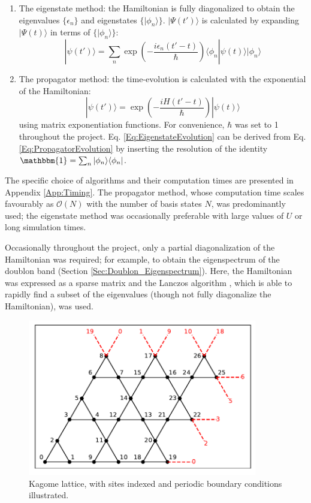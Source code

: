 \begin{enumerate}
    \item The eigenstate method: the Hamiltonian is fully diagonalized to obtain the eigenvalues $\{\epsilon_n\}$ and eigenstates $\{|\phi_n\rangle\}$. $|\Psi(t')\rangle$ is calculated by expanding $|\Psi(t)\rangle$ in terms of $\{|\phi_n\rangle\}$:
    \begin{equation}\label{Eq:EigenstateEvolution}
        |\psi(t')\rangle = \sum_n \exp{\left(-\frac{i\epsilon_{n}(t'-t)}{\hbar}\right)}\langle \phi_n|\psi(t)\rangle|\phi_n\rangle
    \end{equation}
    \item The propagator method: the time-evolution is calculated with the exponential of the Hamiltonian:
    \begin{equation}\label{Eq:PropagatorEvolution}
        |\psi(t')\rangle = \exp{\left(-\frac{iH(t'-t)}{\hbar}\right)}|\psi(t)\rangle
    \end{equation}
    using matrix exponentiation functions. For convenience, $\hbar$ was set to 1 throughout the project. Eq. \ref{Eq:EigenstateEvolution} can be derived from Eq. \ref{Eq:PropagatorEvolution} by inserting the resolution of the identity $\mathbbm{1}=\sum_n|\phi_n\rangle\langle\phi_n|$. 
\end{enumerate}

The specific choice of algorithms and their computation times are presented in Appendix \ref{App:Timing}. The propagator method, whose computation time scales favourably as $\mathcal{O}(N)$ with the number of basis states $N$, was predominantly used; the eigenstate method was occasionally preferable with large values of $U$ or long simulation times. 

Occasionally throughout the project, only a partial diagonalization of the Hamiltonian was required; for example, to obtain the eigenspectrum of the doublon band (Section \ref{Sec:Doublon_Eigenspectrum}). Here, the Hamiltonian was expressed as a sparse matrix and the Lanczos algorithm \cite{Weisse}, which is able to rapidly find a subset of the eigenvalues (though not fully diagonalize the Hamiltonian), was used.

\vspace{0.5cm}

\begin{figure}[ht]
    \centering
    \includegraphics[width=10cm]{Figures/Lattice_Enumerated}
    \caption{Kagome lattice, with sites indexed and periodic boundary conditions illustrated.}
    \label{Fig:Lattice_Enumerated}
\end{figure}